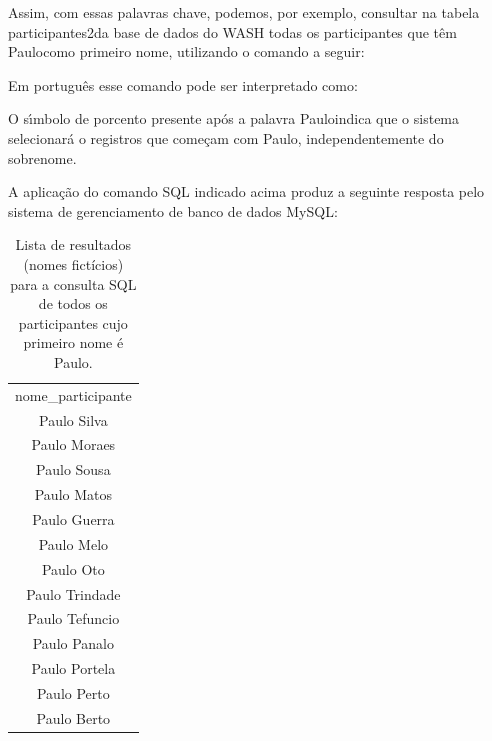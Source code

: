 \documentclass[
12pt,		%
openright,	%
twoside,  %
a4paper,			%
chapter=TITLE,		%
english,			%
french,				%
spanish,			%
brazil				%
]{USPSC-classe/USPSC}
\begin{document}
Assim, com essas palavras chave, podemos, por exemplo, consultar na tabela \textquotedbl participantes2\textquotedbl  da base de dados do WASH todas os participantes que t\^em \textquotedbl Paulo\textquotedbl  como primeiro nome, utilizando o comando a seguir:



\noindent\begin{center}\mbox{\centering{}}\end{center}


Em portugu\^es esse comando pode ser interpretado como:



\noindent\begin{center}\mbox{\centering{}}\end{center}


O s\'{\i}mbolo de porcento presente ap\'os a palavra \textquotedbl Paulo\textquotedbl  indica que o sistema selecionar\'a o registros que come\c{c}am com \textquotedbl Paulo\textquotedbl , independentemente do sobrenome.


A aplica\c{c}\~ao do comando SQL indicado acima produz a seguinte resposta pelo sistema de gerenciamento de banco de dados MySQL:






\begin{table}[htb]
\tiny
\caption{\label{fe3cd6334e1b9072eda70730e1734e26869d9c57}Lista de resultados (nomes fict\'{i}cios) para a consulta SQL de todos os participantes cujo primeiro nome \'e Paulo.}

\centering
\begin{tabular}{|c|}
\hline
nome\_participante        \\
Paulo Silva              \\
Paulo Moraes \\
Paulo Sousa \\
Paulo Matos \\
Paulo Guerra \\
Paulo Melo \\
Paulo Oto \\
Paulo Trindade \\
Paulo Tefuncio \\
Paulo Panalo \\
Paulo Portela \\
Paulo Perto \\
Paulo Berto \\
\hline
\end{tabular}
\end{table}
\end{document}
